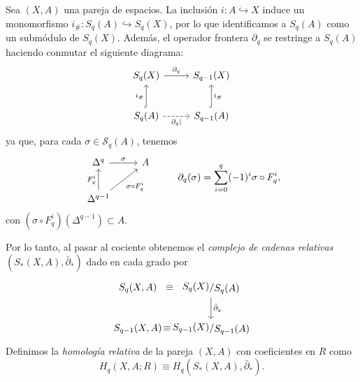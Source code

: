 \begin{definicion}
Sea $(X, A)$ una pareja de espacios. La inclusión $i \colon A \hookrightarrow X$ induce un monomorfismo $i_\# \colon S_q(A) \hookrightarrow S_q(X)$, por lo que identificamos a $S_q(A)$ como un submódulo de $S_q(X)$. Además, el operador frontera $\partial_q$ se restringe a $S_q(A)$ haciendo conmutar el siguiente diagrama:
\[
\begin{tikzcd}[column sep=2.6em, row sep=2.4em]
S_q(X) \arrow[r, "\partial_q"] & S_{q-1}(X) \\
S_q(A) \arrow[u, hook, "i_\#"] \arrow[r, dashed, "\partial_q|"'] & S_{q-1}(A) \arrow[u, hook, "i_\#"']
\end{tikzcd}
\]
ya que, para cada $\sigma \in \mathcal{S}_q(A)$, tenemos
\[
\begin{tikzcd}[column sep=2.4em, row sep=2.2em]
\Delta^q \arrow[r, "\sigma"] & A \\
\Delta^{q-1} \arrow[u, "F_q^i"] \arrow[ur, "\sigma \circ F_q^i"'] &
\end{tikzcd}
\hspace{2.5em}
\partial_q(\sigma) = \sum_{i=0}^q (-1)^i \sigma \circ F_q^i,
\]
con $(\sigma \circ F_q^i)(\Delta^{q-1}) \subset A$.

Por lo tanto, al pasar al cociente obtenemos el \textit{complejo de cadenas relativas} $(S_*(X, A), \bar{\partial}_*)$ dado en cada grado por
\[
\begin{tikzcd}[column sep=0.5em, row sep=2.2em]
S_q(X, A) \arrow[r, phantom, "\equiv"] &[-0.1cm] \raisebox{0.2ex}{$S_q(X)$} / \raisebox{-0.2ex}{$S_q(A)$} \arrow[d, "\bar{\partial}_q"] \\
S_{q-1}(X, A) \arrow[r, phantom, "\equiv"] & \raisebox{0.2ex}{$S_{q-1}(X)$} / \raisebox{-0.2ex}{$S_{q-1}(A)$}
\end{tikzcd}
\]
Definimos la \textit{homología relativa} de la pareja $(X, A)$ con coeficientes en $R$ como
\[
H_q(X, A; R) \equiv H_q(S_*(X, A), \bar{\partial}_*).
\]
\end{definicion}



